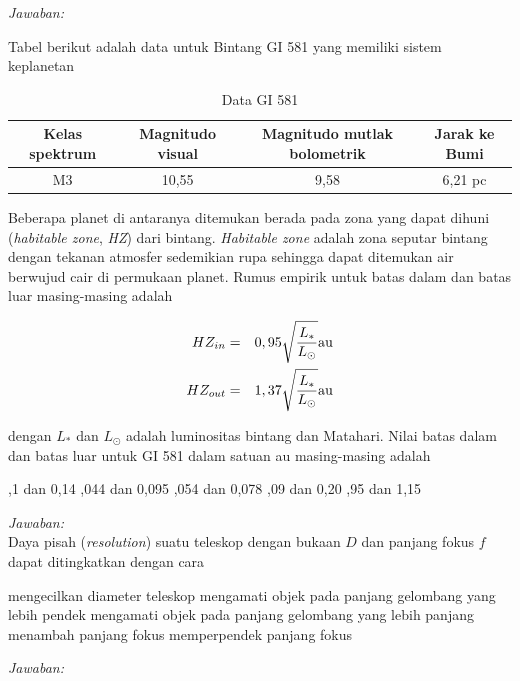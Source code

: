 \documentclass[11pt,fleqn]{exam}
\begin{document}
\begin{questions}
\textit{Jawaban: }

\question Tabel berikut adalah data untuk Bintang GI 581 yang memiliki sistem keplanetan

\begin{table}[h!]
\centering
\caption*{Data GI 581}
\begin{tabular}{|c|c|c|c|}
\hline
Kelas spektrum & Magnitudo visual & Magnitudo mutlak bolometrik & Jarak ke Bumi \\
\hline
M3 & 10,55 & 9,58 & 6,21 pc \\
\hline
\end{tabular}
\end{table}

Beberapa planet di antaranya ditemukan berada pada zona yang dapat dihuni (\textit{habitable zone}, \textit{HZ}) dari bintang. \textit{Habitable zone} adalah zona seputar bintang dengan tekanan atmosfer sedemikian rupa sehingga dapat ditemukan air berwujud cair di permukaan planet. Rumus empirik untuk batas dalam dan batas luar masing-masing adalah

\begin{eqnarray*}
\centering
HZ_{in} &=& 0,95\sqrt{\frac{L_*}{L_{\odot}}} \text{au} \\
HZ_{out} &=& 1,37\sqrt{\frac{L_*}{L_{\odot}}} \text{au}
\end{eqnarray*}

dengan $L_*$ dan $L_{\odot}$ adalah luminositas bintang dan Matahari. Nilai batas dalam dan batas luar untuk GI 581 dalam satuan au masing-masing adalah
\begin{choices}
,1 dan 0,14
,044 dan 0,095
,054 dan 0,078
,09 dan 0,20
,95 dan 1,15
\end{choices}


\textit{Jawaban: }\\

\question Daya pisah (\textit{resolution}) suatu teleskop dengan bukaan $D$ dan panjang fokus $f$ dapat ditingkatkan dengan cara
\begin{choices}
\choice mengecilkan diameter teleskop
\choice mengamati objek pada panjang gelombang yang lebih pendek
\choice mengamati objek pada panjang gelombang yang lebih panjang
\choice menambah panjang fokus
\choice memperpendek panjang fokus
\end{choices}

\textit{Jawaban: }\\


\end{questions}
\end{document}
